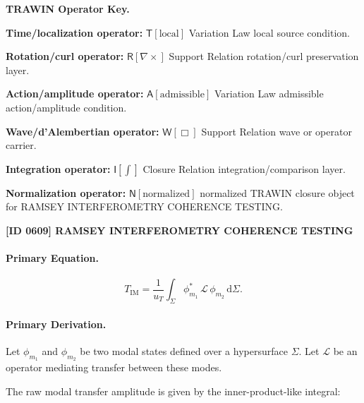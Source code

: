 \par\vspace{0.45\baselineskip}
\noindent\begin{minipage}[t]{\linewidth}
\begingroup
\small
\raggedright
\textbf{TRAWIN Operator Key.}\par
\noindent\textbf{Time/localization operator:} $\mathsf{T}\!\left[\mathrm{local}\right]$ Variation Law local source condition.\par
\noindent\textbf{Rotation/curl operator:} $\mathsf{R}\!\left[\nabla\times\right]$ Support Relation rotation/curl preservation layer.\par
\noindent\textbf{Action/amplitude operator:} $\mathsf{A}\!\left[\mathrm{admissible}\right]$ Variation Law admissible action/amplitude condition.\par
\noindent\textbf{Wave/d'Alembertian operator:} $\mathsf{W}\!\left[\Box\right]$ Support Relation wave or operator carrier.\par
\noindent\textbf{Integration operator:} $\mathsf{I}\!\left[\int\right]$ Closure Relation integration/comparison layer.\par
\noindent\textbf{Normalization operator:} $\mathsf{N}\!\left[\mathrm{normalized}\right]$ normalized TRAWIN closure object for RAMSEY INTERFEROMETRY COHERENCE TESTING.\par
\endgroup
\end{minipage}

\clearpage
\noindent\textbf{[ID 0609] RAMSEY INTERFEROMETRY COHERENCE TESTING}\par
\vspace{0.35em}
\paragraph{Primary Equation.}
\begin{equation}
T_{\mathrm{IM}}
=
\frac{1}{u_T}
\int_{\Sigma}
\phi_{m_1}^{*}
\,\mathcal{L}\,
\phi_{m_2}
\,\mathrm{d}\Sigma .
\end{equation}

\paragraph{Primary Derivation.}
Let $\phi_{m_1}$ and $\phi_{m_2}$ be two modal states defined over a hypersurface $\Sigma$.  
Let $\mathcal{L}$ be an operator mediating transfer between these modes.

The raw modal transfer amplitude is given by the inner-product-like integral:

